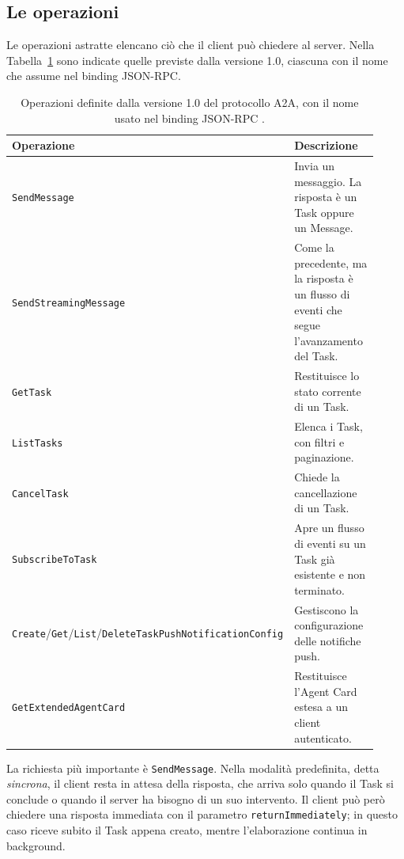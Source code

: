 \subsection{Le operazioni}

Le operazioni astratte elencano ciò che il client può chiedere al server. Nella Tabella~\ref{tab:operazioni-a2a} sono indicate quelle previste dalla versione 1.0, 
ciascuna con il nome che assume nel binding JSON-RPC.

\begin{table}[htbp]
    \centering
    \small
    \begin{tabular}{p{0.36\linewidth} p{0.56\linewidth}}
        \hline
        \textbf{Operazione} & \textbf{Descrizione} \\
        \hline
        \texttt{SendMessage} & Invia un messaggio. La risposta è un Task oppure un Message. \\
        \texttt{Send\allowbreak Streaming\allowbreak Message} & Come la precedente, ma la risposta è un flusso di eventi che segue l'avanzamento del Task. \\
        \texttt{GetTask} & Restituisce lo stato corrente di un Task. \\
        \texttt{ListTasks} & Elenca i Task, con filtri e paginazione. \\
        \texttt{CancelTask} & Chiede la cancellazione di un Task. \\
        \texttt{Subscribe\allowbreak To\allowbreak Task} & Apre un flusso di eventi su un Task già esistente e non terminato. \\
        \texttt{Create}/\texttt{Get}/\texttt{List}/\texttt{Delete}\-\texttt{Task\allowbreak Push\allowbreak Notification\allowbreak Config} & Gestiscono la configurazione delle notifiche push. \\
        \texttt{Get\allowbreak Extended\allowbreak Agent\allowbreak Card} & Restituisce l'Agent Card estesa a un client autenticato. \\
        \hline
    \end{tabular}
    \caption{Operazioni definite dalla versione 1.0 del protocollo A2A, con il nome usato nel binding JSON-RPC \cite{a2aspec}.}
    \label{tab:operazioni-a2a}
\end{table}

La richiesta più importante è \texttt{SendMessage}. Nella modalità predefinita, detta \emph{sincrona}, il client resta in attesa della risposta, che arriva solo quando il Task si conclude o quando il server ha bisogno di un suo intervento. Il client può però chiedere una risposta immediata con il parametro \texttt{return\allowbreak Immediately}; in questo caso riceve subito il Task appena creato, mentre l'elaborazione continua in background.

